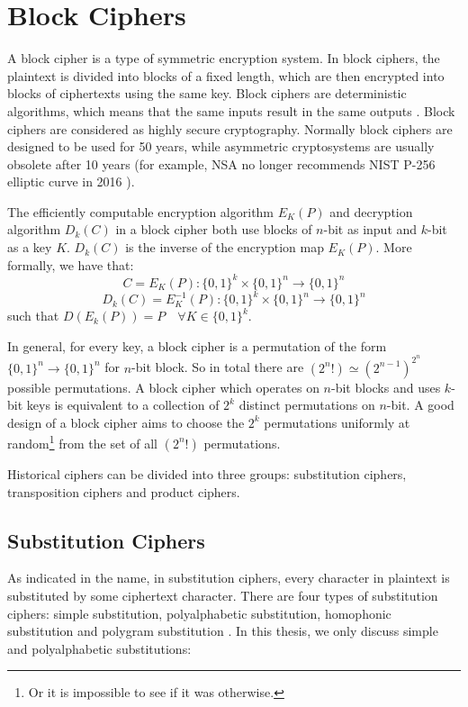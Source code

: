 \section{Block Ciphers}
A block cipher is a type of symmetric encryption system.  In block ciphers, the plaintext is divided into blocks of a fixed length, which are then encrypted into blocks of ciphertexts using the same key. Block ciphers are deterministic algorithms, which means that the same inputs result in the same outputs \cite{delfs2002introduction}. Block ciphers are considered as highly secure cryptography. Normally block ciphers are designed to be used for 50 years, while asymmetric cryptosystems are usually obsolete after 10 years (for example, NSA no longer recommends NIST P-256 elliptic curve in 2016 \cite{NSA16}). 

The efficiently computable encryption algorithm $E_{K}(P)$ and decryption algorithm $D_{k}(C)$ in a block cipher both use blocks of $n$-bit as input and $k$-bit as a key $K$. $D_{k}(C)$ is the inverse of the encryption map $E_{K}(P)$. More formally, we have that: $$C = E_{K}(P) : \{0,1\}^{k} \times \{0,1\}^{n} \rightarrow \{0,1\}^{n}$$
$$D_{k}(C) = E_{K}^{-1}(P) : \{0,1\}^{k} \times \{0,1\}^{n} \rightarrow \{0,1\}^{n}$$
such that $D(E_{k}(P)) = P \quad  \forall K \in \{0,1\}^k$. 

In general, for every key, a block cipher is a permutation of the form $\{0,1\}^{n} \rightarrow \{0,1\}^{n}$ for $n$-bit block. So in total there are $(2^{n}!) \simeq (2^{n-1})^{2^{n}}$ possible permutations. A block cipher which operates on $n$-bit blocks and uses $k$-bit keys is equivalent to a collection of $2^{k}$ distinct permutations on $n$-bit. A good design of a block cipher aims to choose the $2^{k}$ permutations uniformly at random\footnote{Or it is impossible to see if it was otherwise.} from the set of all $(2^{n}!)$ permutations.

Historical ciphers can be divided into three groups: substitution ciphers, transposition ciphers and product ciphers.
\subsection{Substitution Ciphers}
As indicated in the name, in substitution ciphers, every character in plaintext is substituted by some ciphertext character. There are four types of substitution ciphers: simple substitution, polyalphabetic substitution, homophonic substitution and polygram substitution \cite{knudsen1998block}. In this thesis, we only discuss simple and polyalphabetic substitutions:

